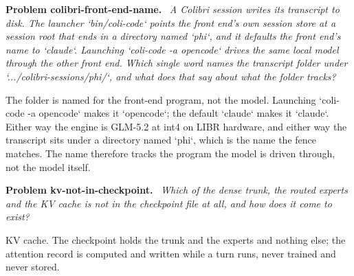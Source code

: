 \documentclass[11pt]{article}
\newenvironment{problem}[1]
  {\par\medskip\noindent\textbf{Problem #1.}\ \itshape}
  {\par\medskip}
\begin{document}
\begin{problem}{colibri-front-end-name}
A Colibri session writes its transcript to disk. The launcher `bin/coli-code` points the front end's own session store at a session root that ends in a directory named `phi`, and it defaults the front end's name to `claude`. Launching `coli-code -a opencode` drives the same local model through the other front end. Which single word names the transcript folder under `.../colibri-sessions/phi/`, and what does that say about what the folder tracks?
\end{problem}
The folder is named for the front-end program, not the model. Launching `coli-code -a opencode` makes it `opencode`; the default `claude` makes it `claude`. Either way the engine is GLM-5.2 at int4 on LIBR hardware, and either way the transcript sits under a directory named `phi`, which is the name the fence matches. The name therefore tracks the program the model is driven through, not the model itself.

\begin{problem}{kv-not-in-checkpoint}
Which of the dense trunk, the routed experts and the KV cache is not in the checkpoint file at all, and how does it come to exist?
\end{problem}
KV cache. The checkpoint holds the trunk and the experts and nothing else; the attention record is computed and written while a turn runs, never trained and never stored.
\end{document}
